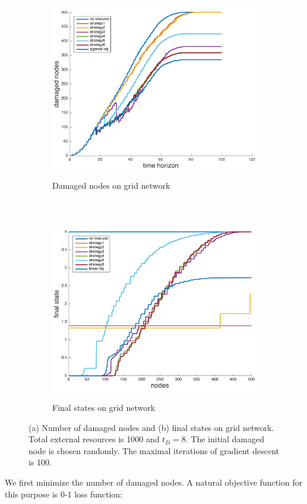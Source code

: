 \begin{figure}
	\centering
	\begin{subfigure}[t]{0.8\textwidth}
		\centering
		\includegraphics[height=80mm]{../figs/no_linear_approximation/Grid_damaged_small.pdf}
		\caption{Damaged nodes on grid network}
	\end{subfigure}
	~
	\begin{subfigure}[t]{0.8\textwidth}
		\centering
		\includegraphics[height=80mm]{../figs/no_linear_approximation/Grid_finalState_small.pdf}
		\caption{Final states on grid network}
	\end{subfigure}
	\caption{(a) Number of damaged nodes and (b) final states on grid network. Total external resources is 1000 and $t_D=8$. The initial damaged node is chosen randomly. The maximal iterations of gradient descent is 100.}
	\label{fig:opt_on_grid}
\end{figure}

We first minimize the number of damaged nodes. A natural objective function for this purpose is 0-1 loss function:

